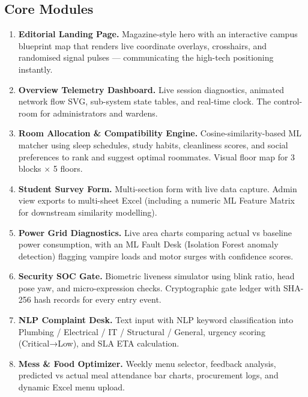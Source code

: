\documentclass[12pt, a4paper]{article}
\begin{document}
\vspace{10pt}

\subsection{Core Modules}

\begin{enumerate}[leftmargin=1.4em, itemsep=6pt]

  \item \textbf{Editorial Landing Page.} Magazine-style hero with an interactive campus blueprint map that renders live coordinate overlays, crosshairs, and randomised signal pulses — communicating the high-tech positioning instantly.

  \item \textbf{Overview Telemetry Dashboard.} Live session diagnostics, animated network flow SVG, sub-system state tables, and real-time clock. The control-room for administrators and wardens.

  \item \textbf{Room Allocation \& Compatibility Engine.} Cosine-similarity-based ML matcher using sleep schedules, study habits, cleanliness scores, and social preferences to rank and suggest optimal roommates. Visual floor map for 3 blocks $\times$ 5 floors.

  \item \textbf{Student Survey Form.} Multi-section form with live data capture. Admin view exports to multi-sheet Excel (including a numeric ML Feature Matrix for downstream similarity modelling).

  \item \textbf{Power Grid Diagnostics.} Live area charts comparing actual vs baseline power consumption, with an ML Fault Desk (Isolation Forest anomaly detection) flagging vampire loads and motor surges with confidence scores.

  \item \textbf{Security SOC Gate.} Biometric liveness simulator using blink ratio, head pose yaw, and micro-expression checks. Cryptographic gate ledger with SHA-256 hash records for every entry event.

  \item \textbf{NLP Complaint Desk.} Text input with NLP keyword classification into Plumbing / Electrical / IT / Structural / General, urgency scoring (Critical→Low), and SLA ETA calculation.

  \item \textbf{Mess \& Food Optimizer.} Weekly menu selector, feedback analysis, predicted vs actual meal attendance bar charts, procurement logs, and dynamic Excel menu upload.


\end{enumerate}
\end{document}
